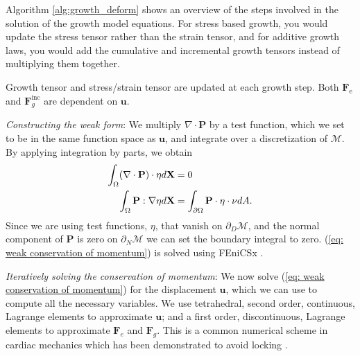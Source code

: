 Algorithm \ref{alg:growth_deform} shows an overview of the steps involved in the solution
of the growth model equations. For stress based growth, you would update the stress tensor rather than the strain tensor, and for additive growth laws, you would add the cumulative and incremental growth tensors instead of multiplying them together. \par
\begin{algorithm} 
    \caption{Growth tensor and stress/strain tensor are updated at each growth step. Both $\mathbf{F}_\mathrm{e}$ and $\mathbf{F}_g^\mathrm{inc}$ are dependent on $\mathbf{u}$.}\label{alg:growth_deform}
    \SetAlgoLined
\end{algorithm} 
\emph{Constructing the weak form}: We multiply $\nabla\cdot\mathbf{P}$ by a test function, which we set to be in the same function space as $\mathbf{u}$, and integrate over a discretization of $\mathcal{M}$. By applying integration by parts, we obtain
\begin{align}
    \label{eq: weak conservation of momentum}
    \int_\Omega(\nabla\cdot\mathbf{P})\cdot\eta d\mathbf{X} &= 0  \notag\\
    \int_\Omega \mathbf{P} : \nabla\eta d\mathbf{X} &= \int_{\partial\Omega}\mathbf{P}\cdot\eta \cdot \nu dA.
\end{align}
Since we are using test functions, $\eta$, that vanish on $\partial_D\mathcal{M}$, and the normal component of $\mathbf{P}$ is zero on $\partial_N\mathcal{M}$ we can set the boundary integral to zero. (\ref{eq: weak conservation of momentum}) is solved using FEniCSx \citep{DOLFINx}. 
\par
\emph{Iteratively solving the conservation of momentum}: We now solve (\ref{eq: weak conservation of momentum}) for the displacement $\mathbf{u}$, which we can use to compute all the necessary variables. We use tetrahedral, second order, continuous, Lagrange elements to approximate $\mathbf{u}$; and a first order, discontinuous, Lagrange elements to approximate $\mathbf{F}_e$ and $\mathbf{F}_g$. This is a common numerical scheme in cardiac mechanics which has been demonstrated to avoid locking \citep{oliveira2016comparison}. 

